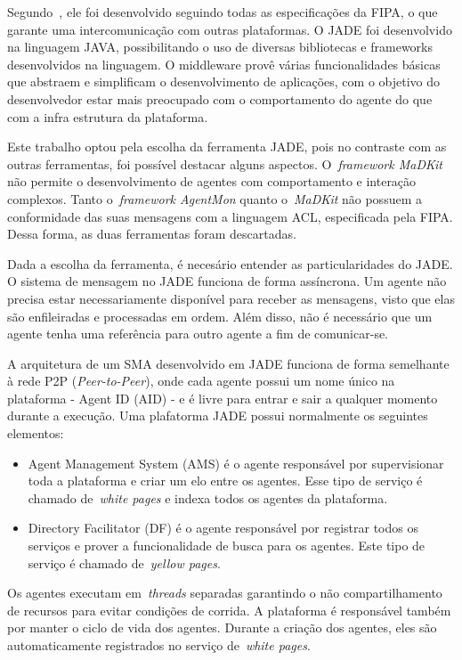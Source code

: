 Segundo~\cite{bellifemine07}, ele foi desenvolvido seguindo todas as especificações da FIPA, o que garante uma intercomunicação com outras plataformas. O JADE foi desenvolvido na linguagem JAVA, possibilitando o uso de diversas bibliotecas e frameworks desenvolvidos na linguagem.
O middleware provê várias funcionalidades básicas que abstraem e simplificam o desenvolvimento de aplicações, com o objetivo do desenvolvedor estar mais preocupado com o comportamento do agente do que com a infra estrutura da plataforma.

Este trabalho optou pela escolha da ferramenta JADE, pois no contraste com as outras ferramentas, foi possível destacar alguns aspectos. O~\emph{framework MaDKit} não permite o desenvolvimento de agentes com comportamento e interação complexos. Tanto o~\emph{framework AgentMon} quanto o~\emph{MaDKit} não possuem a conformidade das suas mensagens com a linguagem ACL, especificada pela FIPA. Dessa forma, as duas ferramentas foram descartadas.

Dada a escolha da ferramenta, é necesário entender as particularidades do JADE. O sistema de mensagem no JADE funciona de forma assíncrona. Um agente não precisa estar necessariamente disponível para receber as mensagens, visto que elas são enfileiradas e processadas em ordem. Além disso, não é necessário que um agente tenha uma referência para outro agente a fim de comunicar-se.

A arquitetura de um SMA desenvolvido em JADE funciona de forma semelhante à rede P2P (\emph{Peer-to-Peer}), onde cada agente possui um nome único na plataforma - Agent ID (AID) - e é livre para entrar e sair a qualquer momento durante a execução. Uma plafatorma JADE possui normalmente os seguintes elementos:

\begin{itemize}
	\item Agent Management System (AMS) é o agente responsável por supervisionar toda a plataforma e criar um elo entre os agentes. Esse tipo de serviço é chamado de~\emph{white pages} e indexa todos os agentes da plataforma.
	\item Directory Facilitator (DF) é o agente responsável por registrar todos os serviços e prover a funcionalidade de busca para os agentes. Este tipo de serviço é chamado de~\emph{yellow pages}.
\end{itemize}

Os agentes executam em~\emph{threads} separadas garantindo o não compartilhamento de recursos para evitar condições de corrida. A plataforma é responsável também por manter o ciclo de vida dos agentes. Durante a criação dos agentes, eles são automaticamente registrados no serviço de~\emph{white pages}.

